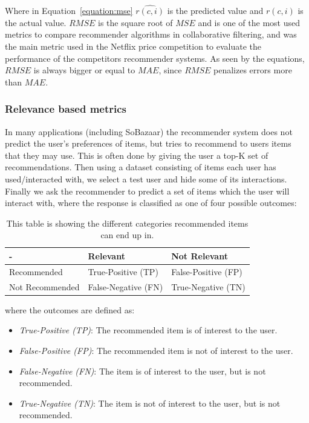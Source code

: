 Where in Equation~\ref{equation:mse} $\hat{r(c,i)}$ is the predicted value and
$r(c,i)$ is the actual value. $RMSE$ is the square root of $MSE$ and is one of
the most used metrics to compare recommender algorithms in collaborative
filtering, and was the main metric used in the Netflix price competition to
evaluate the performance of the competitors recommender systems. As seen by the
equations, $RMSE$ is always bigger or equal to $MAE$, since $RMSE$ penalizes
errors more than $MAE$.

\subsubsection{Relevance based metrics}
\label{subsubsec:relevancemetrics}
In many applications (including SoBazaar) the recommender system does not
predict the user's preferences of items, but tries to recommend to users items
that they may use. This is often done by giving the user a top-K set of
recommendations. Then using a dataset consisting of items each user has
used/interacted with, we select a test user and hide some of its interactions.
Finally we ask the recommender to predict a set of items which the user will
interact with, where the response is classified as one of four possible
outcomes:

\begin{table}[H]
	\centering
	\begin{tabular}{lll}
	\toprule
	-								&	Relevant						&	Not Relevant 				\\
	\midrule
	Recommended			&	True-Positive (TP) 	&	False-Positive (FP)	\\
	Not Recommended	&	False-Negative (FN)	&	True-Negative (TN)	\\
	\bottomrule
	\end{tabular}
    \caption[Usage prediction (Confusion Matrix)]{This table is showing the different categories recommended items can end up in.}
	\label{table:usageprediction}
\end{table}

\noindent
where the outcomes are defined as:

\begin{itemize}
	\item \textit{True-Positive (TP)}: The recommended item is of interest to the
	user.
	\item \textit{False-Positive (FP)}: The recommended item is not of interest to
	the user.
	\item \textit{False-Negative (FN)}: The item is of interest to the user, but is
	not recommended.
	\item \textit{True-Negative (TN)}: The item is not of interest to the user, but
	is not recommended.
\end{itemize}

